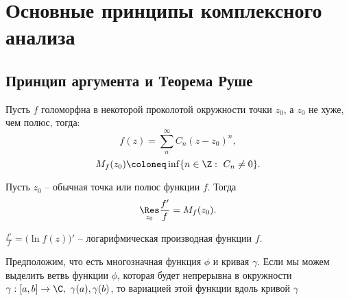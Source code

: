 

\section{Основные принципы комплексного анализа}

\subsection{Принцип аргумента и Теорема Руше}

\begin{definition}
	Пусть $f$ голоморфна в некоторой проколотой окружности точки $z_0$, а $z_0$ не хуже, чем полюс, тогда:
	\[
		f(z) = \sum_{n}^{\infty } C_n (z-z_0)^n,
	\]
	\[
		M_f(z_0) \coloneq \inf \{n \in \Z: \ C_n \ne 0\}.
	\]
\end{definition}

\begin{lemma}
  Пусть $z_0$ -- обычная точка или полюс функции $f$. Тогда
  \[
    \underset{z_0}{\Res} \frac{f'}{f} = M_f(z_0).
  \]
\end{lemma}

\begin{note}
  $\frac{f'}{f} = \big(\ln f(z)\big)' $ -- логарифмическая производная функции $f$.
\end{note}

\begin{remark}
  Предположим, что есть многозначная функция $\phi $ и кривая $\gamma $. Если мы можем выделить ветвь функции $\phi $, которая будет непрерывна в окружности $\gamma : [a,b] \rightarrow \C, \ \gamma (a), \gamma (b)$, то вариацией этой функции вдоль кривой $\gamma $
\end{remark}
